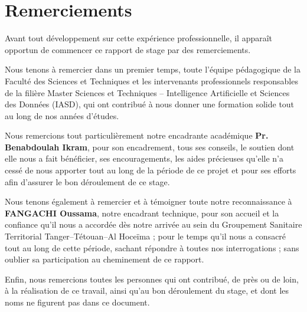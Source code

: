 
\chapter*{Remerciements}

\vspace*{1.5cm}

\begin{flushleft}
\normalsize
Avant tout développement sur cette expérience professionnelle, il apparaît opportun de commencer ce rapport de stage par des remerciements.
\end{flushleft}

\vspace{0.4cm}

\begin{flushleft}
\normalsize
Nous tenons à remercier dans un premier temps, toute l'équipe pédagogique de la Faculté des Sciences et Techniques et les intervenants professionnels responsables de la filière Master Sciences et Techniques -- Intelligence Artificielle et Sciences des Données (IASD), qui ont contribué à nous donner une formation solide tout au long de nos années d'études.
\end{flushleft}

\vspace{0.4cm}

\begin{flushleft}
\normalsize
Nous remercions tout particulièrement notre encadrante académique \textbf{Pr. Benabdoulah Ikram}, pour son encadrement, tous ses conseils, le soutien dont elle nous a fait bénéficier, ses encouragements, les aides précieuses qu'elle n'a cessé de nous apporter tout au long de la période de ce projet et pour ses efforts afin d'assurer le bon déroulement de ce stage.
\end{flushleft}

\vspace{0.4cm}

\begin{flushleft}
\normalsize
Nous tenons également à remercier et à témoigner toute notre reconnaissance à \textbf{FANGACHI Oussama}, notre encadrant technique, pour son accueil et la confiance qu'il nous a accordée dès notre arrivée au sein du Groupement Sanitaire Territorial Tanger--Tétouan--Al Hoceïma ; pour le temps qu'il nous a consacré tout au long de cette période, sachant répondre à toutes nos interrogations ; sans oublier sa participation au cheminement de ce rapport.
\end{flushleft}


\vspace{0.4cm}

\begin{flushleft}
\normalsize
Enfin, nous remercions toutes les personnes qui ont contribué, de près ou de loin, à la réalisation de ce travail, ainsi qu'au bon déroulement du stage, et dont les noms ne figurent pas dans ce document.
\end{flushleft}

